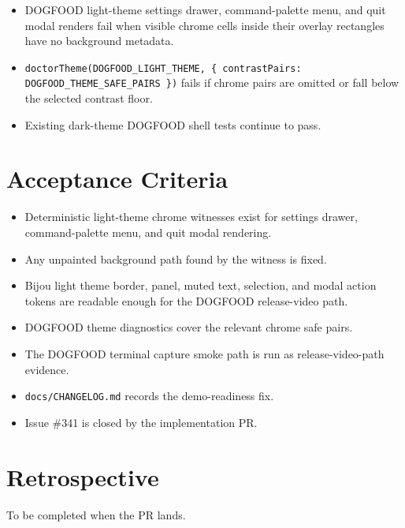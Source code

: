 \begin{itemize}
\tightlist
\item
  DOGFOOD light-theme settings drawer, command-palette menu, and quit modal renders fail when visible chrome cells inside their overlay rectangles have no background metadata.
\item
  \texttt{d\allowbreak{}o\allowbreak{}c\allowbreak{}t\allowbreak{}o\allowbreak{}r\allowbreak{}T\allowbreak{}h\allowbreak{}e\allowbreak{}m\allowbreak{}e\allowbreak{}(\allowbreak{}D\allowbreak{}O\allowbreak{}G\allowbreak{}F\allowbreak{}O\allowbreak{}O\allowbreak{}D\allowbreak{}\_\allowbreak{}L\allowbreak{}I\allowbreak{}G\allowbreak{}H\allowbreak{}T\allowbreak{}\_\allowbreak{}T\allowbreak{}H\allowbreak{}E\allowbreak{}M\allowbreak{}E\allowbreak{},\allowbreak{} \allowbreak{}\{\allowbreak{} \allowbreak{}c\allowbreak{}o\allowbreak{}n\allowbreak{}t\allowbreak{}r\allowbreak{}a\allowbreak{}s\allowbreak{}t\allowbreak{}P\allowbreak{}a\allowbreak{}i\allowbreak{}r\allowbreak{}s\allowbreak{}:\allowbreak{} \allowbreak{}D\allowbreak{}O\allowbreak{}G\allowbreak{}F\allowbreak{}O\allowbreak{}O\allowbreak{}D\allowbreak{}\_\allowbreak{}T\allowbreak{}H\allowbreak{}E\allowbreak{}M\allowbreak{}E\allowbreak{}\_\allowbreak{}S\allowbreak{}A\allowbreak{}F\allowbreak{}E\allowbreak{}\_\allowbreak{}P\allowbreak{}A\allowbreak{}I\allowbreak{}R\allowbreak{}S\allowbreak{} \allowbreak{}\}\allowbreak{})} fails if chrome pairs are omitted or fall below the selected contrast floor.
\item
  Existing dark-theme DOGFOOD shell tests continue to pass.
\end{itemize}

\section{Acceptance Criteria}\label{record-182-acceptance-criteria}

\begin{itemize}
\tightlist
\item
  Deterministic light-theme chrome witnesses exist for settings drawer, command-palette menu, and quit modal rendering.
\item
  Any unpainted background path found by the witness is fixed.
\item
  Bijou light theme border, panel, muted text, selection, and modal action tokens are readable enough for the DOGFOOD release-video path.
\item
  DOGFOOD theme diagnostics cover the relevant chrome safe pairs.
\item
  The DOGFOOD terminal capture smoke path is run as release-video-path evidence.
\item
  \texttt{d\allowbreak{}o\allowbreak{}c\allowbreak{}s\allowbreak{}/\allowbreak{}C\allowbreak{}H\allowbreak{}A\allowbreak{}N\allowbreak{}G\allowbreak{}E\allowbreak{}L\allowbreak{}O\allowbreak{}G\allowbreak{}.\allowbreak{}m\allowbreak{}d} records the demo-readiness fix.
\item
  Issue \#341 is closed by the implementation PR.
\end{itemize}

\section{Retrospective}\label{record-182-retrospective}

To be completed when the PR lands.

